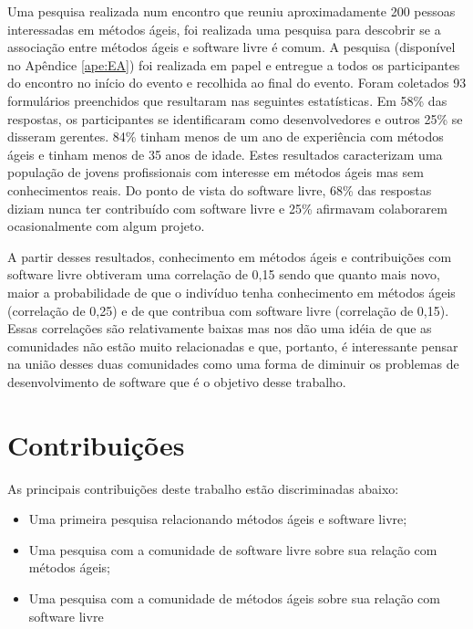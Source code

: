 Uma pesquisa realizada num encontro que reuniu aproximadamente 200
pessoas interessadas em métodos ágeis, foi realizada uma pesquisa para
descobrir se a associação entre métodos ágeis e software livre é
comum. A pesquisa (disponível no Apêndice \ref{ape:EA}) foi realizada
em papel e entregue a todos os participantes do encontro no início do
evento e recolhida ao final do evento. Foram coletados 93 formulários
preenchidos que resultaram nas seguintes estatísticas. Em 58\% das
respostas, os participantes se identificaram como desenvolvedores e
outros 25\% se disseram gerentes. 84\% tinham menos de um ano de
experiência com métodos ágeis e tinham menos de 35 anos de
idade. Estes resultados caracterizam uma população de jovens
profissionais com interesse em métodos ágeis mas sem conhecimentos
reais. Do ponto de vista do software livre, 68\% das respostas diziam
nunca ter contribuído com software livre e 25\% afirmavam colaborarem
ocasionalmente com algum projeto.

A partir desses resultados, conhecimento em métodos ágeis e
contribuições com software livre obtiveram uma correlação de 0,15
sendo que quanto mais novo, maior a probabilidade de que o indivíduo
tenha conhecimento em métodos ágeis (correlação de 0,25) e de que
contribua com software livre (correlação de 0,15). Essas correlações
são relativamente baixas mas nos dão uma idéia de que as comunidades
não estão muito relacionadas e que, portanto, é interessante pensar na
união desses duas comunidades como uma forma de diminuir os problemas
de desenvolvimento de software que é o objetivo desse trabalho.

\section{Contribuições}
\label{sec:contribucoes}

As principais contribuições deste trabalho estão discriminadas abaixo:

\begin{itemize}
\item Uma primeira pesquisa relacionando métodos ágeis e software livre;
\item Uma pesquisa com a comunidade de software livre sobre sua relação com métodos ágeis;
\item Uma pesquisa com a comunidade de métodos ágeis sobre sua relação com software livre
\end{itemize}

